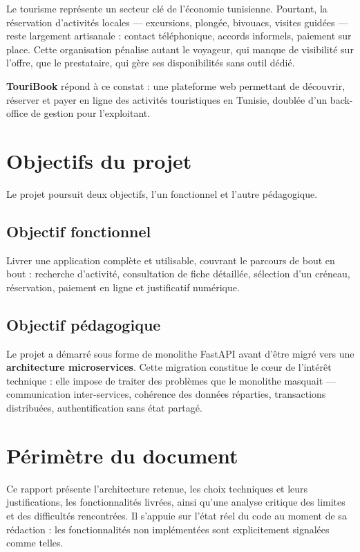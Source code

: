\documentclass[11pt,a4paper]{report}
\begin{document}
Le tourisme représente un secteur clé de l'économie tunisienne. Pourtant, la
réservation d'activités locales — excursions, plongée, bivouacs, visites
guidées — reste largement artisanale : contact téléphonique, accords informels,
paiement sur place. Cette organisation pénalise autant le voyageur, qui manque
de visibilité sur l'offre, que le prestataire, qui gère ses disponibilités sans
outil dédié.

\textbf{TouriBook} répond à ce constat : une plateforme web permettant de
découvrir, réserver et payer en ligne des activités touristiques en Tunisie,
doublée d'un back-office de gestion pour l'exploitant.

\section{Objectifs du projet}

Le projet poursuit deux objectifs, l'un fonctionnel et l'autre pédagogique.

\subsection{Objectif fonctionnel}

Livrer une application complète et utilisable, couvrant le parcours de bout en
bout : recherche d'activité, consultation de fiche détaillée, sélection d'un
créneau, réservation, paiement en ligne et justificatif numérique.

\subsection{Objectif pédagogique}

Le projet a démarré sous forme de monolithe FastAPI avant d'être migré vers une
\textbf{architecture microservices}. Cette migration constitue le cœur de
l'intérêt technique : elle impose de traiter des problèmes que le monolithe
masquait — communication inter-services, cohérence des données réparties,
transactions distribuées, authentification sans état partagé.

\section{Périmètre du document}

Ce rapport présente l'architecture retenue, les choix techniques et leurs
justifications, les fonctionnalités livrées, ainsi qu'une analyse critique des
limites et des difficultés rencontrées. Il s'appuie sur l'état réel du code au
moment de sa rédaction : les fonctionnalités non implémentées sont explicitement
signalées comme telles.
\end{document}
